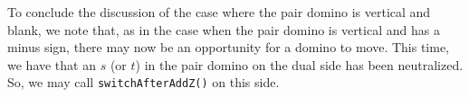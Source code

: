 \documentclass[12pt]{article}
\numberwithin{equation}{section}
\begin{document}
\begin{itemize}
\begin{itemize}
\begin{itemize}
\begin{itemize}
\begin{figure}[H]
          \end{figure}
        \end{itemize}
        To conclude the discussion of the case where the pair domino is vertical and blank, we note that,
        as in the case when the pair domino is vertical and has a minus sign, there may now be an opportunity for a domino to move.
        This time, we have that an $s$ (or $t$) in the pair domino on the dual side has been neutralized.
        So, we may call \texttt{switchAfterAddZ()} on this side.
      \end{itemize}
    \end{itemize}
  \end{itemize}
\end{document}
